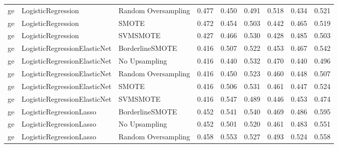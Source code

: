 \begin{tabular}{lllllllll}
      ge &           LogisticRegression & Random Oversampling & 0.477 &                     0.450 &                 0.491 &                  0.518 &                                   0.434 &     0.521 \\
      ge &           LogisticRegression &               SMOTE & 0.472 &                     0.454 &                 0.503 &                  0.442 &                                   0.465 &     0.519 \\
      ge &           LogisticRegression &            SVMSMOTE & 0.427 &                     0.466 &                 0.530 &                  0.428 &                                   0.485 &     0.503 \\
      ge & LogisticRegressionElasticNet &     BorderlineSMOTE & 0.416 &                     0.507 &                 0.522 &                  0.453 &                                   0.467 &     0.542 \\
      ge & LogisticRegressionElasticNet &       No Upsampling & 0.416 &                     0.440 &                 0.532 &                  0.470 &                                   0.440 &     0.496 \\
      ge & LogisticRegressionElasticNet & Random Oversampling & 0.416 &                     0.450 &                 0.523 &                  0.460 &                                   0.448 &     0.507 \\
      ge & LogisticRegressionElasticNet &               SMOTE & 0.416 &                     0.506 &                 0.531 &                  0.461 &                                   0.447 &     0.524 \\
      ge & LogisticRegressionElasticNet &            SVMSMOTE & 0.416 &                     0.547 &                 0.489 &                  0.446 &                                   0.453 &     0.474 \\
      ge &      LogisticRegressionLasso &     BorderlineSMOTE & 0.452 &                     0.541 &                 0.540 &                  0.469 &                                   0.486 &     0.595 \\
      ge &      LogisticRegressionLasso &       No Upsampling & 0.452 &                     0.501 &                 0.520 &                  0.461 &                                   0.483 &     0.551 \\
      ge &      LogisticRegressionLasso & Random Oversampling & 0.458 &                     0.553 &                 0.527 &                  0.493 &                                   0.524 &     0.558 \\

\end{tabular}

